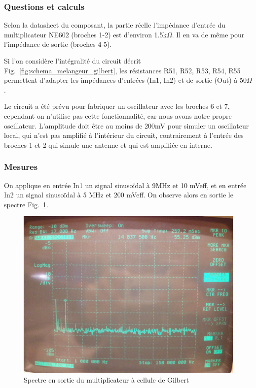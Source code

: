 \documentclass{article}
\begin{document}
\subsubsection{Questions et calculs}


Selon la datasheet du composant, la partie réelle l'impédance d'entrée du multiplicateur NE602 (broches 1-2) est d'environ 1.5k$\Omega$. Il en va de même pour l'impédance de sortie (broches 4-5).

Si l'on considère l'intégralité du circuit décrit Fig.~\ref{fig:schema_melangeur_gilbert}, les résistances R51, R52, R53, R54, R55 permettent d'adapter les impédances d'entrées (In1, In2) et de sortie (Out) à 50$\Omega$.


Le circuit a été prévu pour fabriquer un oscillateur avec les broches 6 et 7, cependant on n'utilise pas cette fonctionnalité, car nous avons notre propre oscillateur. L'amplitude doit être au moins de 200mV pour simuler un oscillateur local, qui n'est pas amplifié à l'intérieur du circuit, contrairement à l'entrée des broches 1 et 2 qui simule une antenne et qui est amplifiée en interne.

\subsubsection{Mesures}


On applique en entrée In1 un signal sinusoïdal à 9MHz et 10 mVeff, et en entrée In2 un signal sinusoïdal à 5 MHz et 200 mVeff. On observe alors en sortie le spectre Fig.~\ref{fig:gilbert_spectre}.

\begin{figure}[h]
	\centering
	\includegraphics[width=0.7\linewidth]{8_3_1.jpg}
	\caption{Spectre en sortie du multiplicateur à cellule de Gilbert}
	\label{fig:gilbert_spectre}
\end{figure}
\end{document}
